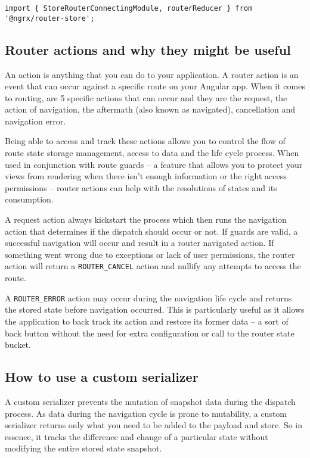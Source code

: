 \begin{lstlisting}
import { StoreRouterConnectingModule, routerReducer } from '@ngrx/router-store';
\end{lstlisting}

\subsection{Router actions and why they might be useful}
An action is anything that you can do to your application. A router action is an
event that can occur against a specific route on your Angular app. When it comes
to routing, are 5 specific actions that can occur and they are the request, the
action of navigation, the aftermath (also known as navigated), cancellation and
navigation error.

Being able to access and track these actions allows you to control the flow of
route state storage management, access to data and the life cycle process. When
used in conjunction with route guards – a feature that allows you to protect
your views from rendering when there isn’t enough information or the right
access permissions – router actions can help with the resolutions of states and
its consumption.

A request action always kickstart the process which then runs the navigation
action that determines if the dispatch should occur or not. If guards are valid,
a successful navigation will occur and result in a router navigated action. If
something went wrong due to exceptions or lack of user permissions, the router
action will return a \texttt{ROUTER\_CANCEL} action and nullify any attempts to
access the route.

A \texttt{ROUTER\_ERROR} action may occur during the navigation life cycle and
returns the stored state before navigation occurred. This is particularly useful
as it allows the application to back track its action and restore its former
data – a sort of back button without the need for extra configuration or call
to the router state bucket.

\subsection{How to use a custom serializer}

A custom serializer prevents the mutation of snapshot data during the dispatch
process. As data during the navigation cycle is prone to mutability, a custom
serializer returns only what you need to be added to the payload and store. So
in essence, it tracks the difference and change of a particular state without
modifying the entire stored state snapshot.

